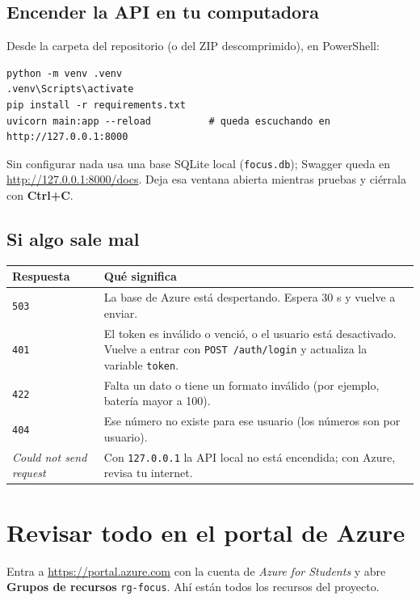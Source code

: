 \documentclass[11pt,a4paper]{article}
\newcommand{\menu}[1]{\textsf{\textbf{#1}}}
\begin{document}
\subsection{Encender la API en tu computadora}\label{sec:local}
Desde la carpeta del repositorio (o del ZIP descomprimido), en PowerShell:
\begin{lstlisting}[language=texto]
python -m venv .venv
.venv\Scripts\activate
pip install -r requirements.txt
uvicorn main:app --reload          # queda escuchando en http://127.0.0.1:8000
\end{lstlisting}
Sin configurar nada usa una base SQLite local (\texttt{focus.db}); Swagger queda en
\url{http://127.0.0.1:8000/docs}. Deja esa ventana abierta mientras pruebas y ciérrala con \menu{Ctrl+C}.

\subsection{Si algo sale mal}
\begin{center}
\renewcommand{\arraystretch}{1.25}
\begin{tabularx}{\textwidth}{>{\raggedright\arraybackslash}p{4.6cm} X}
\toprule
Respuesta & Qué significa \\
\midrule
\texttt{503} & La base de Azure está despertando. Espera 30 s y vuelve a enviar. \\
\texttt{401} & El token es inválido o venció, o el usuario está desactivado. Vuelve a entrar con \texttt{POST /auth/login} y actualiza la variable \texttt{token}. \\
\texttt{422} & Falta un dato o tiene un formato inválido (por ejemplo, batería mayor a 100). \\
\texttt{404} & Ese número no existe para ese usuario (los números son por usuario). \\
\emph{Could not send request} & Con \texttt{127.0.0.1} la API local no está encendida; con Azure, revisa tu internet. \\
\bottomrule
\end{tabularx}
\end{center}

\section{Revisar todo en el portal de Azure}

Entra a \url{https://portal.azure.com} con la cuenta de \emph{Azure for Students} y abre
\menu{Grupos de recursos} \textrightarrow{} \texttt{rg-focus}. Ahí están todos los recursos del proyecto.
\end{document}
